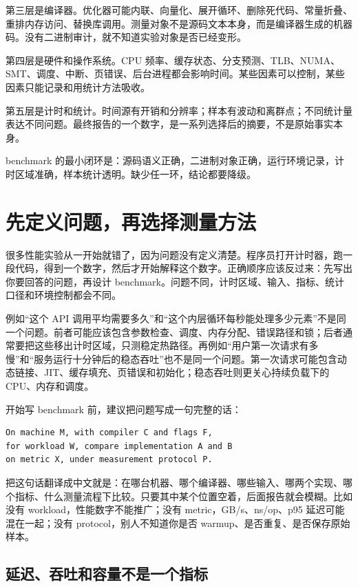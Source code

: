 第三层是编译器。优化器可能内联、向量化、展开循环、删除死代码、常量折叠、重排内存访问、替换库调用。测量对象不是源码文本本身，而是编译器生成的机器码。没有二进制审计，就不知道实验对象是否已经变形。

第四层是硬件和操作系统。CPU 频率、缓存状态、分支预测、TLB、NUMA、SMT、调度、中断、页错误、后台进程都会影响时间。某些因素可以控制，某些因素只能记录和用统计方法吸收。

第五层是计时和统计。时间源有开销和分辨率；样本有波动和离群点；不同统计量表达不同问题。最终报告的一个数字，是一系列选择后的摘要，不是原始事实本身。

\begin{keyidea}
benchmark 的最小闭环是：源码语义正确，二进制对象正确，运行环境记录，计时区域准确，样本统计透明。缺少任一环，结论都要降级。
\end{keyidea}

\section{先定义问题，再选择测量方法}

很多性能实验从一开始就错了，因为问题没有定义清楚。程序员打开计时器，跑一段代码，得到一个数字，然后才开始解释这个数字。正确顺序应该反过来：先写出你要回答的问题，再设计 benchmark。问题不同，计时区域、输入、指标、统计口径和环境控制都会不同。

例如“这个 API 调用平均需要多久”和“这个内层循环每秒能处理多少元素”不是同一个问题。前者可能应该包含参数检查、调度、内存分配、错误路径和锁；后者通常要把这些移出计时区域，只测稳定热路径。再例如“用户第一次请求有多慢”和“服务运行十分钟后的稳态吞吐”也不是同一个问题。第一次请求可能包含动态链接、JIT、缓存填充、页错误和初始化；稳态吞吐则更关心持续负载下的 CPU、内存和调度。

开始写 benchmark 前，建议把问题写成一句完整的话：

\begin{lstlisting}
On machine M, with compiler C and flags F,
for workload W, compare implementation A and B
on metric X, under measurement protocol P.
\end{lstlisting}

把这句话翻译成中文就是：在哪台机器、哪个编译器、哪些输入、哪两个实现、哪个指标、什么测量流程下比较。只要其中某个位置空着，后面报告就会模糊。比如没有 workload，性能数字不能推广；没有 metric，GB/s、ns/op、p95 延迟可能混在一起；没有 protocol，别人不知道你是否 warmup、是否重复、是否保存原始样本。

\subsection{延迟、吞吐和容量不是一个指标}

